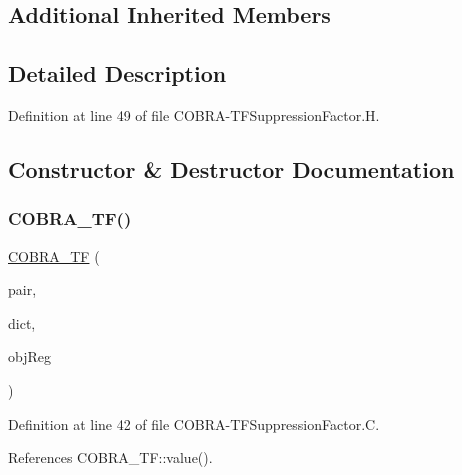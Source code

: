 \subsection*{Additional Inherited Members}


\subsection{Detailed Description}


Definition at line 49 of file C\+O\+B\+R\+A-\/\+T\+F\+Suppression\+Factor.\+H.



\subsection{Constructor \& Destructor Documentation}
\mbox{\label{classFoam_1_1suppressionFactorModels_1_1COBRA__TF_a1eeaa50c15bead60cd3783cdf049cc34}} 
\subsubsection{\texorpdfstring{C\+O\+B\+R\+A\+\_\+\+T\+F()}{COBRA\_TF()}}
{\footnotesize\ttfamily \hyperlink{classFoam_1_1suppressionFactorModels_1_1COBRA__TF}{C\+O\+B\+R\+A\+\_\+\+TF} (\begin{DoxyParamCaption}\item[{const \hyperlink{classFoam_1_1FSPair}{F\+S\+Pair} \&}]{pair,  }\item[{const dictionary \&}]{dict,  }\item[{const object\+Registry \&}]{obj\+Reg }\end{DoxyParamCaption})}



Definition at line 42 of file C\+O\+B\+R\+A-\/\+T\+F\+Suppression\+Factor.\+C.



References C\+O\+B\+R\+A\+\_\+\+T\+F\+::value().

